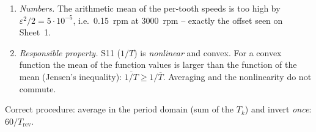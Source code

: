 \begin{solution}
\begin{enumerate}[label=Step \arabic*:,leftmargin=*,itemsep=1pt]
    using $\overline{\sin}=0$ and $\overline{\sin^2}=\frac12$. Hence
    $60/T_{\text{rev}}\approx n_0(1-\varepsilon^2/2)$.
  \item \emph{Numbers.} The arithmetic mean of the per-tooth speeds is too
    high by $\varepsilon^2/2=5\cdot10^{-5}$, i.e.\ \SI{0.15}{rpm} at
    \SI{3000}{rpm} -- exactly the offset seen on Sheet~1.
  \item \emph{Responsible property.} S11 ($1/T$) is \emph{nonlinear} and
    convex. For a convex function the mean of the function values is larger
    than the function of the mean (Jensen's inequality):
    $\overline{1/T}\ge 1/\overline{T}$. Averaging and the nonlinearity do not
    commute.
\end{enumerate}
Correct procedure: average in the period domain (sum of the $T_k$) and invert
\emph{once}: $60/T_{\text{rev}}$.
\end{solution}


